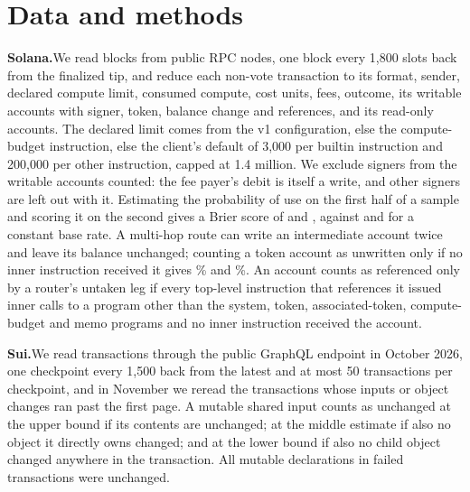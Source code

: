 \documentclass[conference,compsoc]{IEEEtran}
\numberwithin{equation}{section}
\theoremstyle{plain}
\theoremstyle{definition}
\theoremstyle{remark}
\newcommand{\runin}[1]{\par\smallskip\noindent\textbf{#1.}\enspace}
\begin{document}
\section{Data and methods}\label{app:methods}

\runin{Solana}We read blocks from public RPC nodes, one block every 1,800 slots back from the finalized tip, and reduce each non-vote transaction to its format, sender, declared compute limit, consumed compute, cost units, fees, outcome, its writable accounts with signer, token, balance change and references, and its read-only accounts. The declared limit comes from the v1 configuration, else the compute-budget instruction, else the client's default of 3,000 per builtin instruction and 200,000 per other instruction, capped at 1.4 million. We exclude signers from the writable accounts counted: the fee payer's debit is itself a write, and other signers are left out with it. Estimating the probability of use on the first half of a sample and scoring it on the second gives a Brier score of \brierA{} and \brierB{}, against \brierBaseA{} and \brierBaseB{} for a constant base rate. A multi-hop route can write an intermediate account twice and leave its balance unchanged; counting a token account as unwritten only if no inner instruction received it gives \notWrittenStrictA\% and \notWrittenStrictB\%. An account counts as referenced only by a router's untaken leg if every top-level instruction that references it issued inner calls to a program other than the system, token, associated-token, compute-budget and memo programs and no inner instruction received the account.

\runin{Sui}We read transactions through the public GraphQL endpoint in October 2026, one checkpoint every 1,500 back from the latest and at most 50 transactions per checkpoint, and in November we reread the transactions whose inputs or object changes ran past the first page. A mutable shared input counts as unchanged at the upper bound if its contents are unchanged; at the middle estimate if also no object it directly owns changed; and at the lower bound if also no child object changed anywhere in the transaction. All \suiFailedMutable{} mutable declarations in failed transactions were unchanged.
\end{document}
